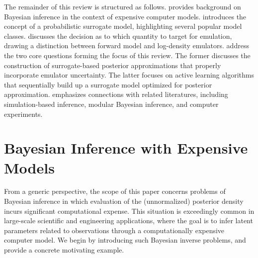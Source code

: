 \documentclass[12pt]{article}
\begin{document}
The remainder of this review is structured as follows.  provides background 
on Bayesian inference in the context of expensive computer models. 
introduces the concept of a probabilistic surrogate model, highlighting several popular 
model classes.  discusses the decision as to which quantity to 
target for emulation, drawing a distinction between forward model and log-density emulators. 
 address the two core questions forming the 
focus of this review. The former discusses the construction of surrogate-based 
posterior approximations that properly incorporate emulator uncertainty. The latter
focuses on active learning algorithms that sequentially build up a surrogate model 
optimized for posterior approximation.  emphasizes connections
with related literatures, including simulation-based inference, modular Bayesian inference,
and computer experiments.


\section{Bayesian Inference with Expensive Models} \label{sec:background}
From a generic perspective, the scope of this paper concerns problems of Bayesian inference in which evaluation
of the (unnormalized) posterior density incurs significant computational expense. This situation is exceedingly common 
in large-scale scientific and engineering applications, where the goal is to infer latent parameters related to 
observations through a computationally expensive computer model. We begin by introducing such Bayesian inverse 
problems, and provide a concrete motivating example. 
 
\end{document}
